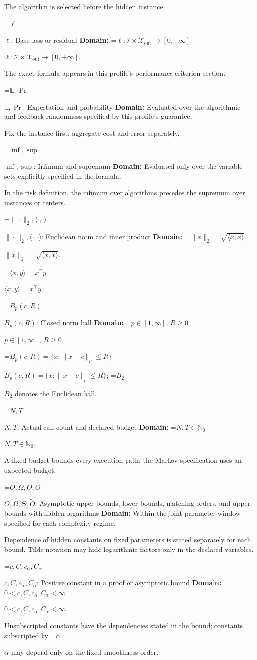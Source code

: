 \documentclass[10pt,a4paper]{article}
\newcommand{\AtlasMath}[1]{\par\begingroup\centering\setbox0=\hbox{$\displaystyle #1$}\ifdim\wd0>1.4\linewidth\typeout{ATLAS WIDE FORMULA: \the\wd0}\fi\ifdim\wd0>\linewidth\resizebox{\linewidth}{!}{\box0}\else\box0\fi\par\endgroup}
\newcommand{\AtlasInlineMath}[1]{\begingroup\setbox0=\hbox{$#1$}\ifdim\wd0>.4\linewidth\endgroup\AtlasMath{#1}\else\endgroup$#1$\fi}
\begin{document}
The algorithm is selected before the hidden instance.

\AtlasInlineMath{\ell}: Base loss or residual \textbf{Domain:} \AtlasInlineMath{\ell:\mathcal{I}\times\mathcal{X}_{\mathrm{out}}\to[0,+\infty]}.

The exact formula appears in this profile's performance-criterion section.

\AtlasInlineMath{\mathbb{E},\Pr}: Expectation and probability \textbf{Domain:} Evaluated over the algorithmic and feedback randomness specified by this profile's guarantee.

Fix the instance first; aggregate cost and error separately.

\AtlasInlineMath{\inf,\sup}: Infimum and supremum \textbf{Domain:} Evaluated only over the variable sets explicitly specified in the formula.

In the risk definition, the infimum over algorithms precedes the supremum over instances or centers.

\AtlasInlineMath{\|\cdot\|_2,\langle\cdot,\cdot\rangle}: Euclidean norm and inner product \textbf{Domain:} \AtlasInlineMath{\|x\|_2=\sqrt{\langle x,x\rangle}}.

\AtlasInlineMath{\langle x,y\rangle=x^\top y}

\AtlasInlineMath{B_p(c,R)}: Closed norm ball \textbf{Domain:} \AtlasInlineMath{p\in[1,\infty],\ R\ge0}.

\AtlasInlineMath{B_p(c,R)=\{x:\|x-c\|_p\le R\}}; \AtlasInlineMath{B_2} denotes the Euclidean ball.

\AtlasInlineMath{N,T}: Actual call count and declared budget \textbf{Domain:} \AtlasInlineMath{N,T\in\mathbb{N}_0}.

A fixed budget bounds every execution path; the Markov specification uses an expected budget.

\AtlasInlineMath{O,\Omega,\Theta,\widetilde{O}}: Asymptotic upper bounds, lower bounds, matching orders, and upper bounds with hidden logarithms \textbf{Domain:} Within the joint parameter window specified for each complexity regime.

Dependence of hidden constants on fixed parameters is stated separately for each bound. Tilde notation may hide logarithmic factors only in the declared variables.

\AtlasInlineMath{c,C,c_\alpha,C_\alpha}: Positive constant in a proof or asymptotic bound \textbf{Domain:} \AtlasInlineMath{0<c,C,c_\alpha,C_\alpha<\infty}.

Unsubscripted constants have the dependencies stated in the bound; constants subscripted by \AtlasInlineMath{\alpha} may depend only on the fixed smoothness order.
\end{document}
